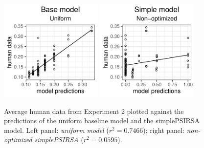 \documentclass[10pt,a4paper]{article}
\begin{document}
\begin{figure}[ht]
	\centering
	\includegraphics[width=2in]{images/x3_m20.pdf}
	\includegraphics[width=2in]{images/x3_m7.pdf}
	\caption{Average human data from Experiment 2 plotted against the predictions of the uniform baseline model and the simplePSIRSA model. 
		Left panel: \emph{uniform model} ($r^{2}=0.7466$);
		right panel: \emph{non-optimized simplePSIRSA} ($r^2=0.0595$).
	}
	\label{base-nonopt-x3}
\end{figure}


\end{document}
